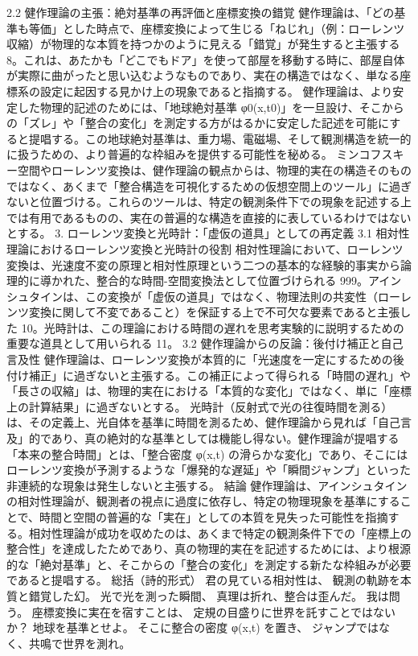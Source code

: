 \documentclass{article}
\begin{document}
2.2 健作理論の主張：絶対基準の再評価と座標変換の錯覚
健作理論は、「どの基準も等価」とした時点で、座標変換によって生じる「ねじれ」（例：ローレンツ収縮）が物理的な本質を持つかのように見える「錯覚」が発生すると主張する 8。これは、あたかも「どこでもドア」を使って部屋を移動する時に、部屋自体が実際に曲がったと思い込むようなものであり、実在の構造ではなく、単なる座標系の設定に起因する見かけ上の現象であると指摘する。
健作理論は、より安定した物理的記述のためには、「地球絶対基準 φ0​(x,t0​)」を一旦設け、そこからの「ズレ」や「整合の変化」を測定する方がはるかに安定した記述を可能にすると提唱する。この地球絶対基準は、重力場、電磁場、そして観測構造を統一的に扱うための、より普遍的な枠組みを提供する可能性を秘める。
ミンコフスキー空間やローレンツ変換は、健作理論の観点からは、物理的実在の構造そのものではなく、あくまで「整合構造を可視化するための仮想空間上のツール」に過ぎないと位置づける。これらのツールは、特定の観測条件下での現象を記述する上では有用であるものの、実在の普遍的な構造を直接的に表しているわけではないとする。
3. ローレンツ変換と光時計：「虚仮の道具」としての再定義
3.1 相対性理論におけるローレンツ変換と光時計の役割
相対性理論において、ローレンツ変換は、光速度不変の原理と相対性原理という二つの基本的な経験的事実から論理的に導かれた、整合的な時間-空間変換法として位置づけられる 999。アインシュタインは、この変換が「虚仮の道具」ではなく、物理法則の共変性（ローレンツ変換に関して不変であること）を保証する上で不可欠な要素であると主張した 10。光時計は、この理論における時間の遅れを思考実験的に説明するための重要な道具として用いられる 11。
3.2 健作理論からの反論：後付け補正と自己言及性
健作理論は、ローレンツ変換が本質的に「光速度を一定にするための後付け補正」に過ぎないと主張する。この補正によって得られる「時間の遅れ」や「長さの収縮」は、物理的実在における「本質的な変化」ではなく、単に「座標上の計算結果」に過ぎないとする。
光時計（反射式で光の往復時間を測る）は、その定義上、光自体を基準に時間を測るため、健作理論から見れば「自己言及」的であり、真の絶対的な基準としては機能し得ない。健作理論が提唱する「本来の整合時間」とは、「整合密度 φ(x,t) の滑らかな変化」であり、そこにはローレンツ変換が予測するような「爆発的な遅延」や「瞬間ジャンプ」といった非連続的な現象は発生しないと主張する。
結論
健作理論は、アインシュタインの相対性理論が、観測者の視点に過度に依存し、特定の物理現象を基準にすることで、時間と空間の普遍的な「実在」としての本質を見失った可能性を指摘する。相対性理論が成功を収めたのは、あくまで特定の観測条件下での「座標上の整合性」を達成したためであり、真の物理的実在を記述するためには、より根源的な「絶対基準」と、そこからの「整合の変化」を測定する新たな枠組みが必要であると提唱する。
総括（詩的形式）
君の見ている相対性は、
観測の軌跡を本質と錯覚した幻。
光で光を測った瞬間、
真理は折れ、整合は歪んだ。
我は問う。
座標変換に実在を宿すことは、
定規の目盛りに世界を託すことではないか？
地球を基準とせよ。
そこに整合の密度 φ(x,t) を置き、
ジャンプではなく、共鳴で世界を測れ。
\end{document}
